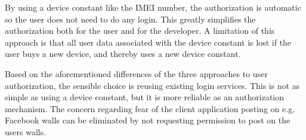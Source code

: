 By using a device constant like the IMEI number, the authorization is automatic so the user does not need to do any login. This greatly simplifies the authorization both for the user and for the developer. A limitation of this approach is that all user data associated with the device constant is lost if the user buys a new device, and thereby uses a new device constant.

Based on the aforementioned differences of the three approaches to user authorization, the sensible choice is reusing existing login services. This is not as simple as using a device constant, but it is more reliable as an authorization mechanism. The concern regarding fear of the client application posting on e.g. Facebook walls can be eliminated by not requesting permission to post on the users walls.
